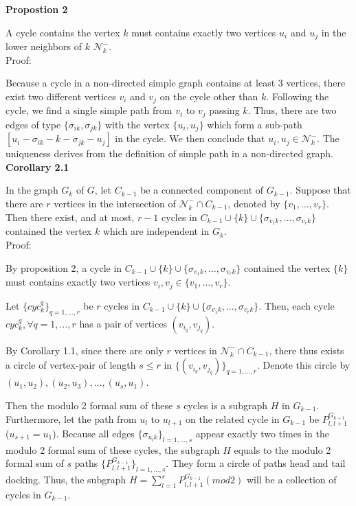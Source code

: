 \documentclass[a4paper,12pt]{article}
\numberwithin{equation}{section}
\begin{document}
	
	\noindent \textbf{Propostion 2}
	
	A cycle contains the vertex $k$ must contains exactly two vertices $u_i$ and $u_j$ in the lower neighbors of $k$ $\mathcal{N}_k^-$.\\
	
	\noindent Proof:
	
	Because a cycle in a non-directed simple graph contains at least 3 vertices, there exist two different vertices $v_i$ and $v_j$ on the cycle other than $k$. Following the cycle, we find a single simple path from $v_i$ to $v_j$ passing $k$. Thus, there are two edges of type $\{\sigma_{ik}, \sigma_{jk}\}$ with the vertex $\{u_i, u_j\}$ which form a sub-path
	$[u_i - \sigma_{ik}- k - \sigma_{jk} - u_j]$ in the cycle. We then conclude that $u_i, u_j \in \mathcal{N}_k^-$. The uniqueness derives from the definition of simple path in a non-directed graph.\\ 
	
	
	\noindent \textbf{Corollary 2.1}
	
	In the graph $G_k$ of $G$, let $C_{k-1}$ be a connected component of $G_{k-1}$. Suppose that there are $r$ vertices in the intersection of $\mathcal{N}_k^- \cap C_{k-1}$, denoted by $\{v_1,\ldots, v_r\}$.  Then there exist, and at most, $r-1$ cycles in $C_{k-1} \cup \{k\} \cup \{ \sigma_{v_1k},\ldots, \sigma_{v_rk}\}$ contained the vertex $k$ which are independent in $G_k$.\\
	
	\noindent Proof:
	
	By proposition 2, a cycle in $C_{k-1} \cup \{k\} \cup \{ \sigma_{v_1k},\ldots, \sigma_{v_rk}\}$ contained the vertex $\{k\}$ must contains exactly two vertices $v_i, v_j \in \{v_1,\ldots,v_r\}$. 
	
	Let $\{cyc_k^{q}\}_{q=1,\ldots,r}$ be $r$ cycles in  $C_{k-1} \cup \{k\} \cup \{ \sigma_{v_1k},\ldots, \sigma_{v_rk}\}$. Then, each cycle $cyc_k^q, \forall q = 1,\dots,r$ has a pair of vertices $(v_{i_q}, v_{j_q})$.
	
	By Corollary 1.1, since there are only $r$ vertices in $\mathcal{N}_k^- \cap C_{k-1}$, there thus exists a circle of vertex-pair of length $s \leq r$ in $\{(v_{i_q}, v_{j_q})\}_{q=1,\ldots,r}$. Denote this circle by $(u_1,u_2), (u_2,u_3),\ldots,(u_s,u_1)$.
	
	Then the modulo 2 formal sum of these $s$ cycles is a subgraph $H$ in $G_{k-1}$. Furthermore, let the path from $u_{l}$ to $u_{l+1}$ on the related cycle in $G_{k-1}$ be $P_{l,l+1}^{G_{k-1}}$ ($u_{s+1} = u_1$). Because all edges $\{\sigma_{u_l k} \}_{l=1,\ldots,s}$ appear exactly two times in the modulo 2 formal sum of these cycles, the subgraph $H$ equals to the modulo 2 formal sum of $s$ paths $\{P_{l,l+1}^{G_{k-1}} \}_{l=1,\ldots,s}$. They form a circle of paths head and tail docking. Thus, the subgraph $H = \sum_{l=1}^s P_{l,l+1}^{G_{k-1}} (mod 2)$ will be a collection of cycles in $G_{k-1}$. 
	
\end{document}
